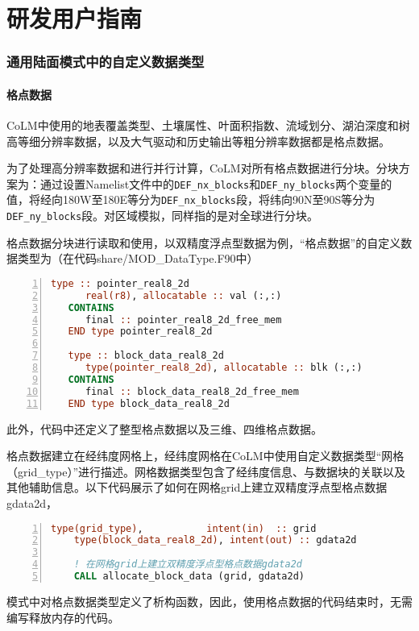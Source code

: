 \part{研发用户指南}

\section{通用陆面模式中的自定义数据类型}

\subsection{格点数据}
CoLM中使用的地表覆盖类型、土壤属性、叶面积指数、流域划分、湖泊深度和树高等细分辨率数据，以及大气驱动和历史输出等粗分辨率数据都是格点数据。

为了处理高分辨率数据和进行并行计算，CoLM对所有格点数据进行分块。分块方案为：通过设置Namelist文件中的\texttt{DEF\_nx\_blocks}和\texttt{DEF\_ny\_blocks}两个变量的值，将经向180\textdegree W至180\textdegree E等分为\texttt{DEF\_nx\_blocks}段，将纬向90\textdegree N至90\textdegree S等分为\texttt{DEF\_ny\_blocks}段。对区域模拟，同样指的是对全球进行分块。

格点数据分块进行读取和使用，以双精度浮点型数据为例，“格点数据”的自定义数据类型为（在代码share/MOD\_DataType.F90中）
\begin{lstlisting}[language=fortran, basicstyle=\linespread{1.0}\footnotesize\ttfamily, commentstyle=\color{black}, numbers=left, numberstyle=\tiny, xleftmargin=1.5em,xrightmargin=0em, aboveskip=1em]
   type :: pointer_real8_2d
      real(r8), allocatable :: val (:,:)
   CONTAINS
      final :: pointer_real8_2d_free_mem
   END type pointer_real8_2d

   type :: block_data_real8_2d
      type(pointer_real8_2d), allocatable :: blk (:,:)
   CONTAINS
      final :: block_data_real8_2d_free_mem
   END type block_data_real8_2d
\end{lstlisting}
此外，代码中还定义了整型格点数据以及三维、四维格点数据。

格点数据建立在经纬度网格上，经纬度网格在CoLM中使用自定义数据类型“网格（grid\_type）”进行描述。网格数据类型包含了经纬度信息、与数据块的关联以及其他辅助信息。以下代码展示了如何在网格grid上建立双精度浮点型格点数据gdata2d，
\begin{lstlisting}[language=fortran, basicstyle=\linespread{1.0}\footnotesize\ttfamily, commentstyle=\color{black}, numbers=left, numberstyle=\tiny, xleftmargin=1.5em,xrightmargin=0em, aboveskip=1em]
    type(grid_type),           intent(in)  :: grid
    type(block_data_real8_2d), intent(out) :: gdata2d

    ! 在网格grid上建立双精度浮点型格点数据gdata2d
    CALL allocate_block_data (grid, gdata2d)
\end{lstlisting}
模式中对格点数据类型定义了析构函数，因此，使用格点数据的代码结束时，无需编写释放内存的代码。


